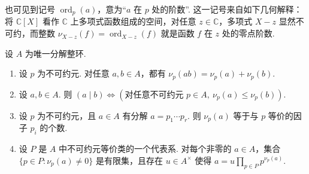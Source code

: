 \begin{remark*}
也可见到记号 $\operatorname{ord}_p(a)$，意为``$a$ 在 $p$ 处的阶数''. 这一记号来自如下几何解释：将 $\mathbb C[X]$ 看作 $\mathbb C$ 上多项式函数组成的空间，对任意 $z\in\mathbb C$，多项式 $X-z$ 显然不可约，而整数 $\nu_{X-z}(f)=\operatorname{ord}_{X-z}(f)$ 就是函数 $f$ 在 $z$ 处的零点阶数.
\end{remark*}


\begin{proposition*}\hypertarget{galois-valuation-properties}{}
设 $A$ 为唯一分解整环.
\begin{enumerate}[label=\roman*)]
\item 设 $p$ 为不可约元. 对任意 $a,b\in A$，都有 $\nu_p(ab)=\nu_p(a)+\nu_p(b)$.
\item 设 $a,b\in A$. 则 $(a\mid b)\Leftrightarrow(\text{对任意不可约元 }p\in A,\ \nu_p(a)\leqslant\nu_p(b))$.
\item 设 $p$ 为不可约元，且 $a\in A$ 有分解 $a=p_1\cdots p_r$. 则 $\nu_p(a)$ 等于与 $p$ 等价的因子 $p_i$ 的个数.
\item 设 $P$ 是 $A$ 中不可约元等价类的一个代表系. 对每个非零的 $a\in A$，集合 $\{p\in P:\nu_p(a)\ne0\}$ 是有限集，且存在 $u\in A^\times$ 使得 $a=u\prod_{p\in P}p^{\nu_p(a)}$.
\end{enumerate}
\end{proposition*}
